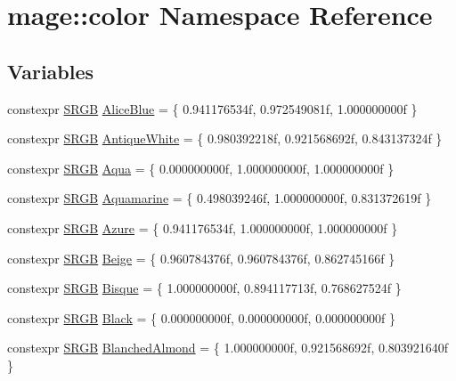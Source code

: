 \hypertarget{namespacemage_1_1color}{}\section{mage\+:\+:color Namespace Reference}
\label{namespacemage_1_1color}
\subsection*{Variables}
\begin{DoxyCompactItemize}
\item 
constexpr \hyperlink{structmage_1_1_s_r_g_b}{S\+R\+GB} \hyperlink{namespacemage_1_1color_a2d5ef85e2e43ff7fb45cef27d4997b3b}{Alice\+Blue} = \{ 0.\+941176534f, 0.\+972549081f, 1.\+000000000f \}
\item 
constexpr \hyperlink{structmage_1_1_s_r_g_b}{S\+R\+GB} \hyperlink{namespacemage_1_1color_a4c8213a7462da60a947162c1d487d584}{Antique\+White} = \{ 0.\+980392218f, 0.\+921568692f, 0.\+843137324f \}
\item 
constexpr \hyperlink{structmage_1_1_s_r_g_b}{S\+R\+GB} \hyperlink{namespacemage_1_1color_aceff28758fa426deb7306624036b1707}{Aqua} = \{ 0.\+000000000f, 1.\+000000000f, 1.\+000000000f \}
\item 
constexpr \hyperlink{structmage_1_1_s_r_g_b}{S\+R\+GB} \hyperlink{namespacemage_1_1color_ae5e7fd9509049a5d51f5793dda07c89a}{Aquamarine} = \{ 0.\+498039246f, 1.\+000000000f, 0.\+831372619f \}
\item 
constexpr \hyperlink{structmage_1_1_s_r_g_b}{S\+R\+GB} \hyperlink{namespacemage_1_1color_a6d140b76616fdb0fe29b8e8111e3fdfd}{Azure} = \{ 0.\+941176534f, 1.\+000000000f, 1.\+000000000f \}
\item 
constexpr \hyperlink{structmage_1_1_s_r_g_b}{S\+R\+GB} \hyperlink{namespacemage_1_1color_a29724d7a84563696c81bde80965df6e9}{Beige} = \{ 0.\+960784376f, 0.\+960784376f, 0.\+862745166f \}
\item 
constexpr \hyperlink{structmage_1_1_s_r_g_b}{S\+R\+GB} \hyperlink{namespacemage_1_1color_acfb911e20ac2103496ab025ca652561a}{Bisque} = \{ 1.\+000000000f, 0.\+894117713f, 0.\+768627524f \}
\item 
constexpr \hyperlink{structmage_1_1_s_r_g_b}{S\+R\+GB} \hyperlink{namespacemage_1_1color_a67092a9054996e6e8b74e5b0214d65b1}{Black} = \{ 0.\+000000000f, 0.\+000000000f, 0.\+000000000f \}
\item 
constexpr \hyperlink{structmage_1_1_s_r_g_b}{S\+R\+GB} \hyperlink{namespacemage_1_1color_ab6df452be70120176935fa2355f8ac28}{Blanched\+Almond} = \{ 1.\+000000000f, 0.\+921568692f, 0.\+803921640f \}

\end{DoxyCompactItemize}
